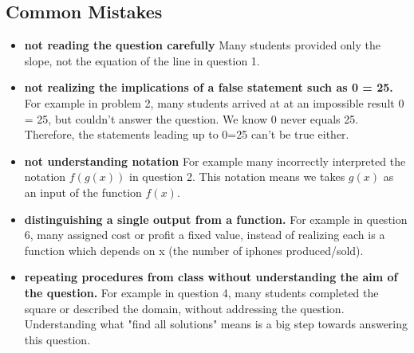 \documentclass[a4paper, 12pt]{article}
\newcommand{\bt}[1]{\textbf{#1}} %
\begin{document}
\subsection*{Common Mistakes}

\begin{itemize}
    \item \bt{not reading the question carefully} Many students provided only the slope, not the equation of the line in question 1. 
    \item \bt{not realizing the implications of a false statement such as 0 = 25.} For example in problem 2, many students arrived at at an impossible result 0 = 25, but couldn't answer the question. We know 0 never equals 25. Therefore, the statements leading up to 0=25 can't be true either.
    \item \bt{not understanding notation} For example many incorrectly interpreted the notation $f(g(x))$ in question 2.
    This notation means we takes $g(x)$ as an input of the function $f(x)$.
    
    \item \bt{distinguishing a single output from a function.} For example in question 6, many assigned cost or profit a fixed value, instead of realizing each is a function which depends on x (the number of iphones produced/sold).

    \item \bt{repeating procedures from class without understanding the aim of the question.} For example in question 4, many students completed the square or described the domain, without addressing the question. Understanding what "find all solutions" means is a big step towards answering this question. 
\end{itemize}
\end{document}
